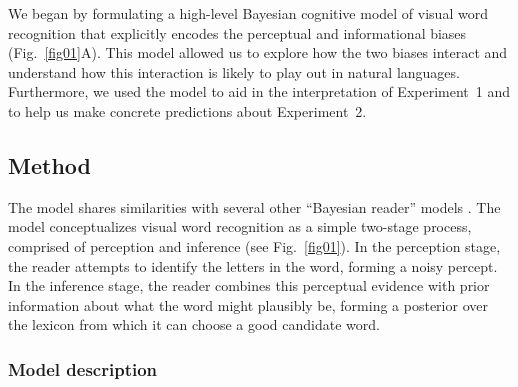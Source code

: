 \documentclass[doc,biblatex,floatsintext]{apa7}
\begin{document}
We began by formulating a high-level Bayesian cognitive model of visual word recognition that explicitly encodes the perceptual and informational biases (Fig.~\ref{fig01}A). This model allowed us to explore how the two biases interact and understand how this interaction is likely to play out in natural languages. Furthermore, we used the model to aid in the interpretation of Experiment~1 and to help us make concrete predictions about Experiment~2.

\subsection{Method}

The model shares similarities with several other ``Bayesian reader'' models \parencite{Norris:2006, Norris:2009, SmithChan:2010, Bicknell:2012, Norris:2012, Valdois:2021}. The model conceptualizes visual word recognition as a simple two-stage process, comprised of perception and inference (see Fig.~\ref{fig01}). In the perception stage, the reader attempts to identify the letters in the word, forming a noisy percept. In the inference stage, the reader combines this perceptual evidence with prior information about what the word might plausibly be, forming a posterior over the lexicon from which it can choose a good candidate word.

\subsubsection{Model description}
\end{document}
